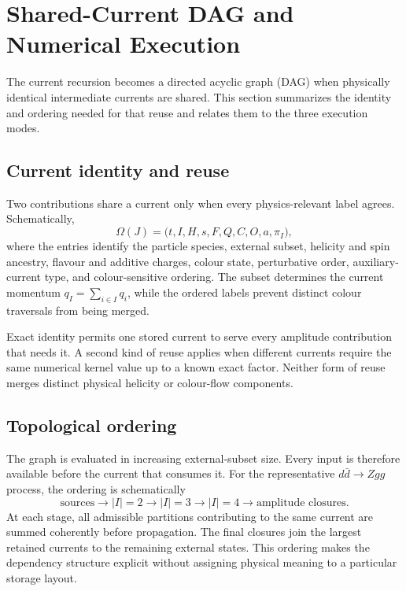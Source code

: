 \section{\texorpdfstring{Shared-Current DAG and Numerical Execution}{Shared-Current DAG and Numerical Execution}}
\label{sec:zgg-dag}

The current recursion becomes a directed acyclic graph (DAG) when physically
identical intermediate currents are shared. This section summarizes the
identity and ordering needed for that reuse and relates them to the three
execution modes.

\subsection{Current identity and reuse}

Two contributions share a current only when every physics-relevant label
agrees. Schematically,
\begin{equation}
 \Omega(J)=
 \bigl(t,I,H,s,F,Q,C,O,a,\pi_I\bigr),
 \label{eq:zgg-current-key}
\end{equation}
where the entries identify the particle species, external subset, helicity and
spin ancestry, flavour and additive charges, colour state, perturbative order,
auxiliary-current type, and colour-sensitive ordering. The subset determines
the current momentum \(q_I=\sum_{i\in I}q_i\), while the ordered labels prevent
distinct colour traversals from being merged.

Exact identity permits one stored current to serve every amplitude contribution
that needs it. A second kind of reuse applies when different currents require
the same numerical kernel value up to a known exact factor. Neither form of
reuse merges distinct physical helicity or colour-flow components.

\subsection{Topological ordering}

The graph is evaluated in increasing external-subset size. Every input is
therefore available before the current that consumes it. For the representative
\(d\bar d\to Zgg\) process, the ordering is schematically
\begin{equation}
 \boxed{\text{sources}}
 \longrightarrow
 \boxed{|I|=2}
 \longrightarrow
 \boxed{|I|=3}
 \longrightarrow
 \boxed{|I|=4}
 \longrightarrow
 \boxed{\text{amplitude closures}} .
 \label{eq:zgg-stage-chain}
\end{equation}
At each stage, all admissible partitions contributing to the same current are
summed coherently before propagation. The final closures join the largest
retained currents to the remaining external states. This ordering makes the
dependency structure explicit without assigning physical meaning to a
particular storage layout.

